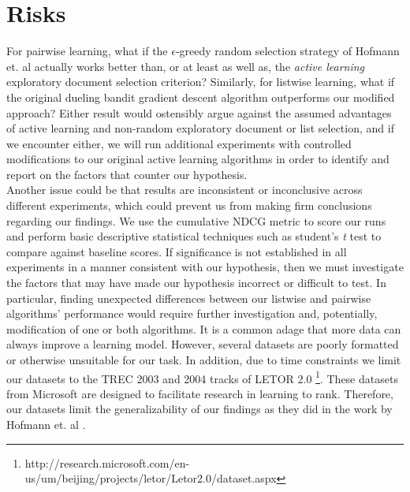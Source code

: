 \documentclass{acm_proc_article-sp}
\begin{document}
\section{Risks}
For pairwise learning, what if the $\epsilon$-greedy random selection strategy of Hofmann et. al \cite{hofmann} actually works better than, or at least as well as, the \emph{active learning} exploratory document selection criterion? Similarly, for listwise learning, what if the original dueling bandit gradient descent algorithm outperforms our modified approach? Either result would ostensibly argue against the assumed advantages of active learning and non-random exploratory document or list selection, and if we encounter either, we will run additional experiments with controlled modifications to our original active learning algorithms in order to identify and report on the factors that counter our hypothesis.\\ 
Another issue could be that results are inconsistent or inconclusive across different experiments, which could prevent us from making firm conclusions regarding our findings. We use the cumulative NDCG metric to score our runs and perform basic descriptive statistical techniques such as student's \emph{t} test to compare against baseline scores. If significance is not established in all experiments in a manner consistent with our hypothesis, then we must investigate the factors that may have made our hypothesis incorrect or difficult to test. In particular, finding unexpected differences between our listwise and pairwise algorithms' performance would require further investigation and,  potentially, modification of one or both algorithms. It is a common adage that more data can always improve a learning model. However, several datasets are poorly formatted or otherwise unsuitable for our task. In addition, due to time constraints we limit our datasets to the TREC 2003 and 2004 tracks of LETOR 2.0 \footnote{http://research.microsoft.com/en-us/um/beijing/projects/letor/Letor2.0/dataset.aspx}. These datasets from Microsoft are designed to facilitate research in learning to rank. Therefore, our datasets limit the generalizability of our findings as they did in the work by Hofmann et. al \cite{hofmann}.
\end{document}
